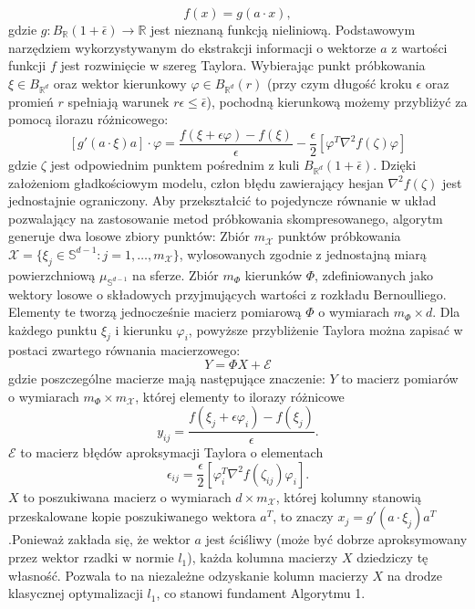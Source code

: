 $$f(x) = g(a \cdot x),$$
gdzie $g: B_{\mathbb{R}}(1+\bar{\epsilon}) \to \mathbb{R}$ jest nieznaną funkcją nieliniową. Podstawowym narzędziem wykorzystywanym do ekstrakcji informacji o wektorze $a$ z wartości funkcji $f$ jest rozwinięcie w szereg Taylora. Wybierając punkt próbkowania $\xi \in B_{\mathbb{R}^d}$ oraz wektor kierunkowy $\varphi \in B_{\mathbb{R}^d}(r)$ (przy czym długość kroku $\epsilon$ oraz promień $r$ spełniają warunek $r\epsilon \le \bar{\epsilon}$), pochodną kierunkową możemy przybliżyć za pomocą ilorazu różnicowego:
$$[g'(a \cdot \xi)a] \cdot \varphi = \frac{f(\xi+\epsilon\varphi) - f(\xi)}{\epsilon} - \frac{\epsilon}{2}[\varphi^T \nabla^2 f(\zeta) \varphi]$$gdzie $\zeta$ jest odpowiednim punktem pośrednim z kuli $B_{\mathbb{R}^d}(1+\bar{\epsilon})$. Dzięki założeniom gładkościowym modelu, człon błędu zawierający hesjan $\nabla^2 f(\zeta)$ jest jednostajnie ograniczony. Aby przekształcić to pojedyncze równanie w układ pozwalający na zastosowanie metod próbkowania skompresowanego, algorytm generuje dwa losowe zbiory punktów:
Zbiór $m_\mathcal{X}$ punktów próbkowania $\mathcal{X} = \{\xi_j \in \mathbb{S}^{d-1} : j = 1, \dots, m_\mathcal{X}\}$, wylosowanych zgodnie z jednostajną miarą powierzchniową $\mu_{\mathbb{S}^{d-1}}$ na sferze. Zbiór $m_\Phi$ kierunków $\Phi$, zdefiniowanych jako wektory losowe o składowych przyjmujących wartości z rozkładu Bernoulliego. Elementy te tworzą jednocześnie macierz pomiarową $\Phi$ o wymiarach $m_\Phi \times d$. Dla każdego punktu $\xi_j$ i kierunku $\varphi_i$, powyższe przybliżenie Taylora można zapisać w postaci zwartego równania macierzowego:
$$Y = \Phi X + \mathcal{E}$$gdzie poszczególne macierze mają następujące znaczenie: $Y$ to macierz pomiarów o wymiarach $m_\Phi \times m_\mathcal{X}$, której elementy to ilorazy różnicowe $$y_{ij} = \frac{f(\xi_j+\epsilon\varphi_i) - f(\xi_j)}{\epsilon}.$$
$\mathcal{E}$ to macierz błędów aproksymacji Taylora o elementach $$\epsilon_{ij} = \frac{\epsilon}{2}[\varphi_i^T \nabla^2 f(\zeta_{ij}) \varphi_i].$$
$X$ to poszukiwana macierz o wymiarach $d \times m_\mathcal{X}$, której kolumny stanowią przeskalowane kopie poszukiwanego wektora $a^T$, to znaczy $x_j = g'(a \cdot \xi_j)a^T$.Ponieważ zakłada się, że wektor $a$ jest ściśliwy (może być dobrze aproksymowany przez wektor rzadki w normie $l_1$), każda kolumna macierzy $X$ dziedziczy tę własność. Pozwala to na niezależne odzyskanie kolumn macierzy $X$ na drodze klasycznej optymalizacji $l_1$, co stanowi fundament Algorytmu 1.

